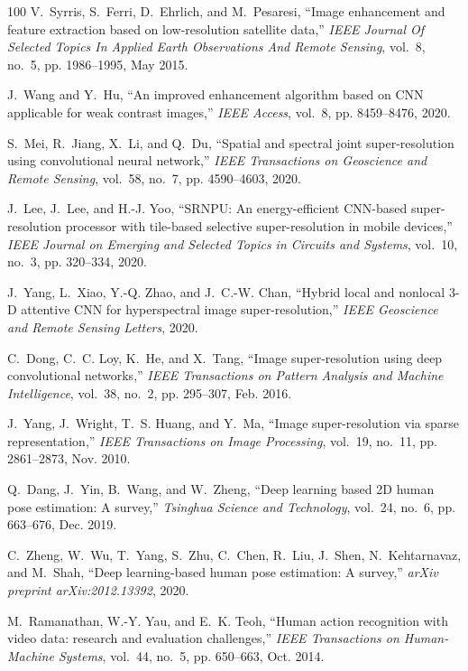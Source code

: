 \documentclass[journal]{IEEEtran}
\begin{document}
\begin{thebibliography}{100}
	V.~Syrris, S.~Ferri, D.~Ehrlich, and M.~Pesaresi, ``Image enhancement and
	feature extraction based on low-resolution satellite data,'' \emph{IEEE
		Journal Of Selected Topics In Applied Earth Observations And Remote Sensing},
	vol.~8, no.~5, pp. 1986--1995, May 2015.
	
	J.~Wang and Y.~Hu, ``An improved enhancement algorithm based on {CNN}
	applicable for weak contrast images,'' \emph{IEEE Access}, vol.~8, pp.
	8459--8476, 2020.
	
	S.~Mei, R.~Jiang, X.~Li, and Q.~Du, ``Spatial and spectral joint
	super-resolution using convolutional neural network,'' \emph{IEEE
		Transactions on Geoscience and Remote Sensing}, vol.~58, no.~7, pp.
	4590--4603, 2020.
	
	J.~Lee, J.~Lee, and H.-J. Yoo, ``{SRNPU}: An energy-efficient {CNN}-based
	super-resolution processor with tile-based selective super-resolution in
	mobile devices,'' \emph{IEEE Journal on Emerging and Selected Topics in
		Circuits and Systems}, vol.~10, no.~3, pp. 320--334, 2020.
	
	J.~Yang, L.~Xiao, Y.-Q. Zhao, and J.~C.-W. Chan, ``Hybrid local and nonlocal
	{3-D} attentive {CNN} for hyperspectral image super-resolution,'' \emph{IEEE
		Geoscience and Remote Sensing Letters}, 2020.
	
	C.~Dong, C.~C. Loy, K.~He, and X.~Tang, ``Image super-resolution using deep
	convolutional networks,'' \emph{IEEE Transactions on Pattern Analysis and
		Machine Intelligence}, vol.~38, no.~2, pp. 295--307, Feb. 2016.
	
	J.~Yang, J.~Wright, T.~S. Huang, and Y.~Ma, ``Image super-resolution via sparse
	representation,'' \emph{IEEE Transactions on Image Processing}, vol.~19,
	no.~11, pp. 2861--2873, Nov. 2010.
	
	Q.~Dang, J.~Yin, B.~Wang, and W.~Zheng, ``Deep learning based {2D} human pose
	estimation: A survey,'' \emph{Tsinghua Science and Technology}, vol.~24,
	no.~6, pp. 663--676, Dec. 2019.
	
	C.~Zheng, W.~Wu, T.~Yang, S.~Zhu, C.~Chen, R.~Liu, J.~Shen, N.~Kehtarnavaz, and
	M.~Shah, ``Deep learning-based human pose estimation: A survey,'' \emph{arXiv
		preprint arXiv:2012.13392}, 2020.
	
	M.~Ramanathan, W.-Y. Yau, and E.~K. Teoh, ``Human action recognition with video
	data: research and evaluation challenges,'' \emph{IEEE Transactions on
		Human-Machine Systems}, vol.~44, no.~5, pp. 650--663, Oct. 2014.
	

\end{thebibliography}
\end{document}
